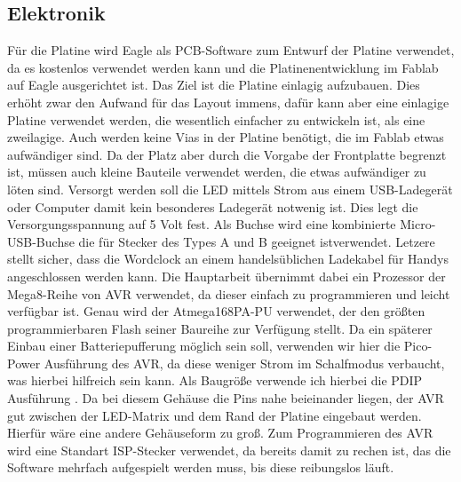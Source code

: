\documentclass[12pt,journal,compsoc]{IEEEtran}
\begin{document}
\subsection{Elektronik}
Für die Platine wird Eagle als PCB-Software zum Entwurf der Platine verwendet, da es kostenlos verwendet werden kann und die Platinenentwicklung im Fablab auf Eagle ausgerichtet ist. Das Ziel ist die Platine einlagig aufzubauen. Dies erhöht zwar den Aufwand für das Layout immens, dafür kann aber eine einlagige Platine verwendet werden, die wesentlich einfacher zu entwickeln ist, als eine zweilagige. Auch werden keine Vias in der Platine benötigt, die im Fablab etwas aufwändiger sind. Da der Platz aber durch die Vorgabe der Frontplatte begrenzt ist, müssen auch kleine Bauteile verwendet werden, die etwas aufwändiger zu löten sind.
Versorgt werden soll die LED mittels Strom aus einem USB-Ladegerät oder Computer damit kein besonderes Ladegerät notwenig ist. Dies legt die Versorgungsspannung auf 5 Volt fest. Als Buchse wird eine kombinierte Micro-USB-Buchse die für Stecker des Types A und B geeignet istverwendet. Letzere stellt sicher, dass  die Wordclock an einem handelsüblichen Ladekabel für Handys angeschlossen werden kann.
 Die Hauptarbeit übernimmt dabei ein Prozessor der  Mega8-Reihe von AVR verwendet, da dieser einfach zu programmieren und leicht verfügbar ist. Genau wird der Atmega168PA-PU verwendet, der den größten programmierbaren Flash seiner Baureihe zur Verfügung stellt. Da ein späterer Einbau einer Batteriepufferung möglich sein soll, verwenden wir hier die   Pico-Power Ausführung des AVR, da diese weniger Strom im Schalfmodus verbaucht, was hierbei hilfreich sein kann. Als Baugröße verwende ich hierbei die PDIP  Ausführung . Da bei diesem Gehäuse die Pins nahe beieinander liegen, der AVR gut zwischen der LED-Matrix und dem Rand der Platine eingebaut werden. Hierfür wäre eine andere Gehäuseform zu groß. Zum Programmieren des AVR wird eine Standart ISP-Stecker verwendet, da bereits damit zu rechen ist, das die Software mehrfach aufgespielt werden muss, bis diese reibungslos läuft. 
\end{document}
